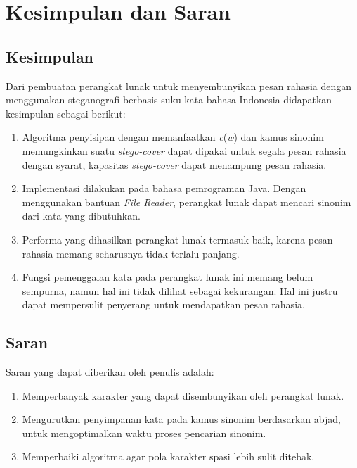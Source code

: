 \chapter{Kesimpulan dan Saran}
\section{Kesimpulan}
Dari pembuatan perangkat lunak untuk menyembunyikan pesan rahasia dengan menggunakan steganografi berbasis suku kata bahasa Indonesia didapatkan kesimpulan sebagai berikut:
\begin{enumerate}
	\item Algoritma penyisipan dengan memanfaatkan \textit{c}(\textit{w}) dan kamus sinonim memungkinkan suatu \textit{stego-cover} dapat dipakai untuk segala pesan rahasia dengan syarat, kapasitas \textit{stego-cover} dapat menampung pesan rahasia.
	\item Implementasi dilakukan pada bahasa pemrograman Java. Dengan menggunakan bantuan \textit{File Reader}, perangkat lunak dapat mencari sinonim dari kata yang dibutuhkan.
	\item Performa yang dihasilkan perangkat lunak termasuk baik, karena pesan rahasia memang seharusnya tidak terlalu panjang.
	\item Fungsi pemenggalan kata pada perangkat lunak ini memang belum sempurna, namun hal ini tidak dilihat sebagai kekurangan. Hal ini justru dapat mempersulit penyerang untuk mendapatkan pesan rahasia.
	
\end{enumerate}

\section{Saran}
Saran yang dapat diberikan oleh penulis adalah:
\begin{enumerate}
	\item Memperbanyak karakter yang dapat disembunyikan oleh perangkat lunak.
	\item Mengurutkan penyimpanan kata pada kamus sinonim berdasarkan abjad, untuk mengoptimalkan waktu proses pencarian sinonim.
	\item Memperbaiki algoritma agar pola karakter spasi lebih sulit ditebak.
\end{enumerate}